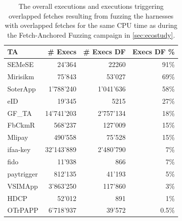 \documentclass[conference]{IEEEtran}
\newcommand{\stagetwo}{Fetch-Anchored Fuzzing\xspace}
\newcommand{\eighteigthce}{Mlipay\xspace}
\newcommand{\aseventhreefour}{GF\_TA\xspace}
\newcommand{\sixfivefivea}{OTrPAPP\xspace}
\newcommand{\eightaaa}{Mirisikm\xspace}
\newcommand{\zeroeightzeroone}{ifaa-key\xspace}
\newcommand{\onefourbzero}{fido\xspace}
\newcommand{\dfonee}{paytrigger\xspace}
\newcommand{\fivethreefourfive}{SEMeSE\xspace}
\newcommand{\anineeightfive}{eID\xspace}
\newcommand{\foureightfourfour}{HDCP\xspace}
\newcommand{\foursixsixtwo}{FbCkmR\xspace}
\newcommand{\threesevensevene}{SoterApp\xspace}
\newcommand{\threedzeroeight}{VSIMApp\xspace}
\newcommand{\numexecseighteightce}{490'558\xspace}
\newcommand{\numexecsdfeighteightce}{75'528\xspace}
\newcommand{\numexecsdfperceighteightce}{15\%\xspace}
\newcommand{\numexecsaseventhreefour}{14'741'203\xspace}
\newcommand{\numexecsdfaseventhreefour}{2'757'134\xspace}
\newcommand{\numexecsdfpercaseventhreefour}{18\%\xspace}
\newcommand{\numexecssixfivefivea}{6'718'937\xspace}
\newcommand{\numexecsdfsixfivefivea}{39'572\xspace}
\newcommand{\numexecsdfpercsixfivefivea}{0.5\%\xspace}
\newcommand{\numexecseightaaa}{75'843\xspace}
\newcommand{\numexecsdfeightaaa}{53'027\xspace}
\newcommand{\numexecsdfperceightaaa}{69\%\xspace}
\newcommand{\numexecszeroeightzeroone}{32'143'889\xspace}
\newcommand{\numexecsdfzeroeightzeroone}{2'480'790\xspace}
\newcommand{\numexecsdfperczeroeightzeroone}{7\%\xspace}
\newcommand{\numexecsonefourbzero}{11'938\xspace}
\newcommand{\numexecsdfonefourbzero}{866\xspace}
\newcommand{\numexecsdfperconefourbzero}{7\%\xspace}
\newcommand{\numexecsdfonee}{812'135\xspace}
\newcommand{\numexecsdfdfonee}{41'193\xspace}
\newcommand{\numexecsdfpercdfonee}{5\%\xspace}
\newcommand{\numexecsfivethreefourfive}{24'364\xspace}
\newcommand{\numexecsdffivethreefourfive}{22260\xspace}
\newcommand{\numexecsdfpercfivethreefourfive}{91\%\xspace}
\newcommand{\numexecsanineeightfive}{19'345\xspace}
\newcommand{\numexecsdfanineeightfive}{5215\xspace}
\newcommand{\numexecsdfpercanineeightfive}{27\%\xspace}
\newcommand{\numexecsfoureightfourfour}{52'012\xspace}
\newcommand{\numexecsdffoureightfourfour}{891\xspace}
\newcommand{\numexecsdfpercfoureightfourfour}{1\%\xspace}
\newcommand{\numexecsthreedzeroeight}{3'863'250\xspace}
\newcommand{\numexecsdfthreedzeroeight}{117'860\xspace}
\newcommand{\numexecsdfpercthreedzeroeight}{3\%\xspace}
\newcommand{\numexecsfoursixsixtwo}{568'237\xspace}
\newcommand{\numexecsdffoursixsixtwo}{127'009\xspace}
\newcommand{\numexecsdfpercfoursixsixtwo}{15\%\xspace}
\newcommand{\numexecsthreesevensevene}{1'788'240\xspace}
\newcommand{\numexecsdfthreesevensevene}{1'041'636\xspace}
\newcommand{\numexecsdfpercthreesevensevene}{58\%\xspace}
\begin{document}
\begin{table}[t]
    \footnotesize
    \centering
    \begin{tabular}{lrrr}
        \toprule
        TA&
        \# Execs &
        \# Execs DF &
        Execs DF \%\\
        \toprule
        \fivethreefourfive & \numexecsfivethreefourfive &\numexecsdffivethreefourfive  & \numexecsdfpercfivethreefourfive\\
        \eightaaa & \numexecseightaaa &\numexecsdfeightaaa  & \numexecsdfperceightaaa\\
        \threesevensevene & \numexecsthreesevensevene &\numexecsdfthreesevensevene  &\numexecsdfpercthreesevensevene\\
        \anineeightfive & \numexecsanineeightfive &\numexecsdfanineeightfive  &\numexecsdfpercanineeightfive\\
        \aseventhreefour & \numexecsaseventhreefour &\numexecsdfaseventhreefour  &\numexecsdfpercaseventhreefour\\
        \foursixsixtwo & \numexecsfoursixsixtwo &\numexecsdffoursixsixtwo  &\numexecsdfpercfoursixsixtwo\\
        \eighteigthce & \numexecseighteightce  & \numexecsdfeighteightce &\numexecsdfperceighteightce\\
        \zeroeightzeroone & \numexecszeroeightzeroone &\numexecsdfzeroeightzeroone  &\numexecsdfperczeroeightzeroone\\
        \onefourbzero & \numexecsonefourbzero &\numexecsdfonefourbzero  &\numexecsdfperconefourbzero\\
        \dfonee & \numexecsdfonee &\numexecsdfdfonee  &\numexecsdfpercdfonee\\
        \threedzeroeight & \numexecsthreedzeroeight  & \numexecsdfthreedzeroeight &\numexecsdfpercthreedzeroeight\\
        \foureightfourfour & \numexecsfoureightfourfour &\numexecsdffoureightfourfour  &\numexecsdfpercfoureightfourfour\\
        \sixfivefivea & \numexecssixfivefivea &\numexecsdfsixfivefivea  &\numexecsdfpercsixfivefivea\\
        
        \bottomrule
    \end{tabular}
    \caption{
        The overall executions and executions triggering overlapped fetches resulting from fuzzing the harnesses with overlapped 
        fetches for the same CPU time as during the \stagetwo campaign in \autoref{sec:ecostudy}. 
    }
    \label{tab:reshape}
\end{table}
\end{document}
